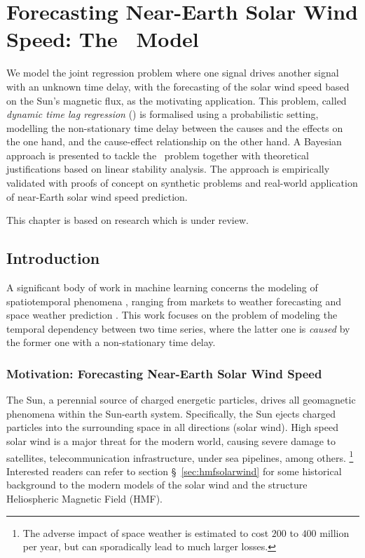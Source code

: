 \chapter{Forecasting Near-Earth Solar Wind Speed: The \XX \ Model}\label{chapter:pdt}

{\small
  We model the joint regression problem where one signal drives another signal with an unknown time delay, with the 
  forecasting of the solar wind speed based on the Sun's magnetic flux, as the motivating application. This problem, called 
  \emph{dynamic time lag regression} (\XX) is formalised using a probabilistic setting, modelling the non-stationary 
  time delay between the causes and the effects on the one hand, and the cause-effect relationship on the other hand. 
  A Bayesian approach is presented to tackle the \XX\ problem together with theoretical justifications based on 
  linear stability analysis. The approach is empirically validated with proofs of concept on synthetic problems and 
  real-world application of near-Earth solar wind speed prediction. 
}


\vfill
{}
\vfill

\noindent
    \parbox{\textwidth}{%
        {\small This chapter is based on research which is under review.}
    }%


\clearpage


\section{Introduction}\label{sec:intro}
A significant body of work in machine learning concerns the modeling of spatiotemporal phenomena 
\citep{SurveyST,NIPSForecasting18}, ranging from markets \citep{Pedreschi} to weather forecasting 
\citep{Horvitz} and space weather prediction \citep{EnricoLorentz,camporeale2018machine,EnricoArxiv}. 
This work focuses on the problem of modeling the temporal dependency between two time series, where the 
latter one is {\em caused} by the former one \citep{Granger} with a non-stationary time delay. 


\subsection{Motivation: Forecasting Near-Earth Solar Wind Speed}\label{sec:motivationsolarwind}
The Sun, a perennial source of charged energetic particles, drives all geomagnetic phenomena within the Sun-earth system. 
Specifically, the Sun ejects charged particles into the surrounding space in all directions (solar wind). High speed solar wind 
is a major threat for the modern world, causing severe damage to satellites, telecommunication infrastructure, under sea 
pipelines, among others. \footnote{The adverse impact of space weather is estimated to cost $200$ to $400$ million per year, 
but can sporadically lead to much larger losses.} Interested readers can refer to section \S~\ref{sec:hmfsolarwind} for some 
historical background to the modern models of the solar wind and the structure Heliospheric Magnetic Field (HMF). 


